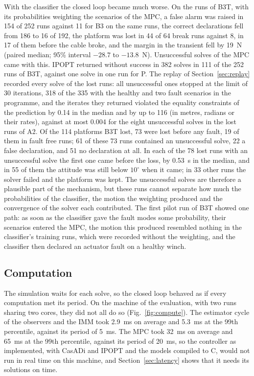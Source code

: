 \documentclass[a4paper,fleqn]{cas-dc}
\begin{document}
With the classifier the closed loop became much worse. On the runs of B3T, with its probabilities weighting the scenarios of the MPC, a false alarm was raised in 154 of 252 runs against 11 for B3 on the same runs, the correct declarations fell from 186 to 16 of 192, the platform was lost in 44 of 64 break runs against 8, in 17 of them before the cable broke, and the margin in the transient fell by 19~N (paired median; 95\% interval $-28.7$ to $-13.8$~N). Unsuccessful solves of the MPC came with this. IPOPT returned without success in 382 solves in 111 of the 252 runs of B3T, against one solve in one run for P. The replay of Section~\ref{sec:replay} recorded every solve of the lost runs: all unsuccessful ones stopped at the limit of 30 iterations, 318 of the 335 with the healthy and two fault scenarios in the programme, and the iterates they returned violated the equality constraints of the prediction by 0.14 in the median and by up to 116 (in metres, radians or their rates), against at most 0.004 for the eight unsuccessful solves in the lost runs of A2. Of the 114 platforms B3T lost, 73 were lost before any fault, 19 of them in fault free runs; 61 of these 73 runs contained an unsuccessful solve, 22 a false declaration, and 51 no declaration at all. In each of the 78 lost runs with an unsuccessful solve the first one came before the loss, by 0.53~s in the median, and in 55 of them the attitude was still below $10^\circ$ when it came; in 33 other runs the solver failed and the platform was kept. The unsuccessful solves are therefore a plausible part of the mechanism, but these runs cannot separate how much the probabilities of the classifier, the motion the weighting produced and the convergence of the solver each contributed. The first pilot run of B3T showed one path: as soon as the classifier gave the fault modes some probability, their scenarios entered the MPC, the motion this produced resembled nothing in the classifier's training runs, which were recorded without the weighting, and the classifier then declared an actuator fault on a healthy winch.

\subsection{Computation}\label{sec:compute}

The simulation waits for each solve, so the closed loop behaved as if every computation met its period. On the machine of the evaluation, with two runs sharing two cores, they did not all do so (Fig.~\ref{fig:compute}). The estimator cycle of the observers and the IMM took 2.9~ms on average and 5.3~ms at the 99th percentile, against its period of 5~ms. The MPC took 32~ms on average and 65~ms at the 99th percentile, against its period of 20~ms, so the controller as implemented, with CasADi and IPOPT and the models compiled to C, would not run in real time on this machine, and Section~\ref{sec:latency} shows that it needs its solutions on time.
\end{document}
